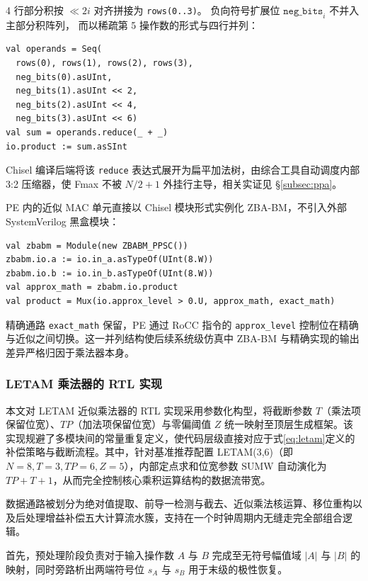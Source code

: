 \documentclass[12pt,a4paper,UTF8]{article}
\begin{document}
4 行部分积按 $\ll 2i$ 对齐拼接为 \texttt{rows(0..3)}。
负向符号扩展位 $\mathtt{neg\_bits}_i$ 不并入主部分积阵列，
而以稀疏第 5 操作数的形式与四行并列：

\begin{lstlisting}[caption={稀疏第 5 操作数的并行累加},label={lst:zbabm-reduce},basicstyle=\ttfamily\small,language={}]
val operands = Seq(
  rows(0), rows(1), rows(2), rows(3),
  neg_bits(0).asUInt,
  neg_bits(1).asUInt << 2,
  neg_bits(2).asUInt << 4,
  neg_bits(3).asUInt << 6)
val sum = operands.reduce(_ + _)
io.product := sum.asSInt
\end{lstlisting}

Chisel 编译后端将该 \texttt{reduce} 表达式展开为扁平加法树，由综合工具自动调度内部 3:2 压缩器，使 Fmax 不被 $N/2+1$ 外挂行主导，相关实证见 §\ref{subsec:ppa}。

PE 内的近似 MAC 单元直接以 Chisel 模块形式实例化 ZBA-BM，不引入外部 SystemVerilog 黑盒模块：

\begin{lstlisting}[caption={ZBA-BM 在 Gemmini PE 中的集成},label={lst:zbabm-pe},basicstyle=\ttfamily\small,language={}]
val zbabm = Module(new ZBABM_PPSC())
zbabm.io.a := io.in_a.asTypeOf(UInt(8.W))
zbabm.io.b := io.in_b.asTypeOf(UInt(8.W))
val approx_math = zbabm.io.product
val product = Mux(io.approx_level > 0.U, approx_math, exact_math)
\end{lstlisting}

精确通路 \texttt{exact\_math} 保留，PE 通过 RoCC 指令的 \texttt{approx\_level} 控制位在精确与近似之间切换。这一并列结构使后续系统级仿真中 ZBA-BM 与精确实现的输出差异严格归因于乘法器本身。

\subsubsection{LETAM 乘法器的 RTL 实现}

本文对 LETAM 近似乘法器的 RTL 实现采用参数化构型，将截断参数 $T$（乘法项保留位宽）、$TP$（加法项保留位宽）与零偏阈值 $Z$ 统一映射至顶层生成框架。该实现规避了多模块间的常量重复定义，使代码层级直接对应于式\eqref{eq:letam}定义的补偿策略与截断流程。其中，针对基准推荐配置 LETAM(3,6)（即 $N=8, T=3, TP=6, Z=5$），内部定点求和位宽参数 $\mathrm{SUMW}$ 自动演化为 $TP+T+1$，从而完全控制核心乘积运算结构的数据流带宽。

数据通路被划分为绝对值提取、前导一检测与截去、近似乘法核运算、移位重构以及后处理增益补偿五大计算流水簇，支持在一个时钟周期内无缝走完全部组合逻辑。

首先，预处理阶段负责对于输入操作数 $A$ 与 $B$ 完成至无符号幅值域 $|A|$ 与 $|B|$ 的映射，同时旁路析出两端符号位 $s_A$ 与 $s_B$ 用于末级的极性恢复。
\end{document}
